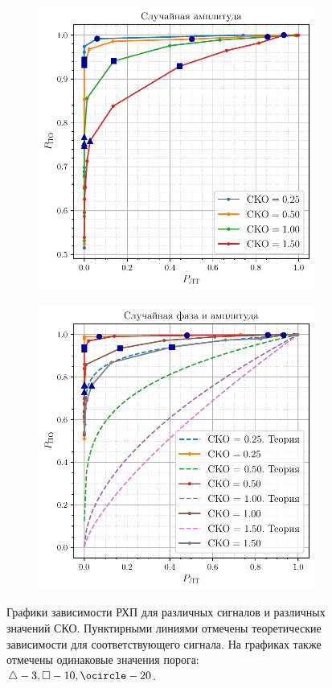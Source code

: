 \begin{figure}[H]
    \centering
    \begin{subfigure}{0.49\linewidth}
	    \includegraphics[width=\linewidth]{data/data_amplitude.pdf}
    \end{subfigure}
    \begin{subfigure}{0.49\linewidth}
	    \includegraphics[width=\linewidth]{data/data_phase_amplitude.pdf}
    \end{subfigure}
    \caption{Графики зависимости РХП для различных сигналов и различных значений СКО. Пунктирными линиями 
    отмечены теоретические зависимости для соответствующего сигнала.
    На графиках также отмечены одинаковые значения порога: $\triangle - 3, \square - 10, \ocircle - 20$.}
    \label{fig:task3}
\end{figure}



